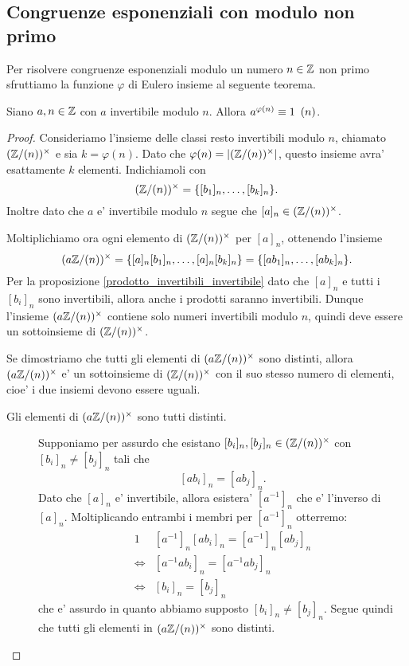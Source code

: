 \subsection{Congruenze esponenziali con modulo non primo}

Per risolvere congruenze esponenziali modulo un numero $n \in \mathbb{Z}$ non primo sfruttiamo la funzione $\varphi$ di Eulero insieme al seguente teorema.

\begin{theorem}
    [di Eulero] \label{th_Eulero}
    Siano $a, n \in \mathbb{Z}$ con $a$ invertibile modulo $n$. Allora $a^{\varphi(n)} \equiv 1 \ \left(n\right)$.
\end{theorem}
\begin{proof}
    Consideriamo l'insieme delle classi resto invertibili modulo $n$, chiamato $(\mathbb{Z}/(n))^{\times}$ e sia $k = \varphi(n)$. Dato che $\varphi(n) = \left|(\mathbb{Z}/(n))^{\times}\right|$, questo insieme avra' esattamente $k$ elementi. Indichiamoli con \[
        (\mathbb{Z}/(n))^{\times} = \{[b_1]_n, \dots, [b_k]_n\}.   
    \]
    Inoltre dato che $a$ e' invertibile modulo $n$ segue che $[a]_n \in (\mathbb{Z}/(n))^{\times}$. 

    Moltiplichiamo ora ogni elemento di $(\mathbb{Z}/(n))^{\times}$ per $[a]_n$, ottenendo l'insieme \[
        (a\mathbb{Z}/(n))^{\times} = \{[a]_n[b_1]_n, \dots, [a]_n[b_k]_n\} = \{[ab_1]_n, \dots, [ab_k]_n\}.
    \]
    Per la proposizione \ref{prodotto_invertibili_invertibile} dato che $[a]_n$ e tutti i $[b_i]_n$ sono invertibili, allora anche i prodotti saranno invertibili. Dunque l'insieme $(a\mathbb{Z}/(n))^{\times}$ contiene solo numeri invertibili modulo $n$, quindi deve essere un sottoinsieme di $(\mathbb{Z}/(n))^{\times}$.

    Se dimostriamo che tutti gli elementi di $(a\mathbb{Z}/(n))^{\times}$ sono distinti, allora $(a\mathbb{Z}/(n))^{\times}$ e' un sottoinsieme di $(\mathbb{Z}/(n))^{\times}$ con il suo stesso numero di elementi, cioe' i due insiemi devono essere uguali.

    \begin{description}
        \item[Gli elementi di $(a\mathbb{Z}/(n))^{\times}$ sono tutti distinti.] Supponiamo per assurdo che esistano $[b_i]_n, [b_j]_n \in (\mathbb{Z}/(n))^{\times}$ con $[b_i]_n \neq [b_j]_n$ tali che \[
            [ab_i]_n = [ab_j]_n.
        \]
        Dato che $[a]_n$ e' invertibile, allora esistera' $[a^{-1}]_n$ che e' l'inverso di $[a]_n$. Moltiplicando entrambi i membri per $[a^{-1}]_n$ otterremo: \begin{alignat*}
            {1}
            &[a^{-1}]_n[ab_i]_n = [a^{-1}]_n[ab_j]_n \\
            \iff &[a^{-1}ab_i]_n = [a^{-1}ab_j]_n \\
            \iff &[b_i]_n = [b_j]_n 
        \end{alignat*}
        che e' assurdo in quanto abbiamo supposto $[b_i]_n \neq [b_j]_n$. Segue quindi che tutti gli elementi in $(a\mathbb{Z}/(n))^{\times}$ sono distinti.
    \end{description}


\end{proof}
